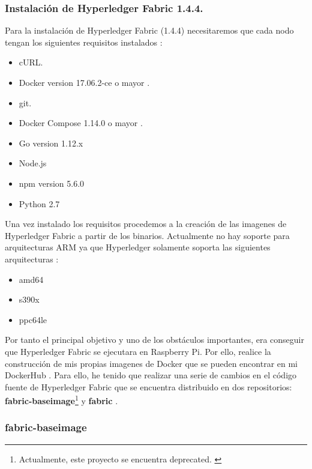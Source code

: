 \newpage

\subsubsection*{Instalación de Hyperledger Fabric 1.4.4.}

Para la instalación de Hyperledger Fabric (1.4.4) necesitaremos que cada nodo tengan los siguientes requisitos instalados 
\cite{hyperledger-fabric-docs}:

\begin{itemize}
  \item cURL.
  \item Docker version 17.06.2-ce o mayor \cite{install-docker-rasp, set-up-docker-rasp}.
  \item git.
  \item Docker Compose 1.14.0 o mayor \cite{install-docker-rasp, set-up-docker-rasp}.
  \item Go version 1.12.x
  \item Node.js
  \item npm version 5.6.0
  \item Python 2.7
\end{itemize}

\noindent Una vez instalado los requisitos procedemos a la creación de las imagenes de Hyperledger Fabric a partir de 
los binarios. Actualmente no hay soporte para arquitecturas ARM ya que Hyperledger solamente soporta las siguientes 
arquitecturas \cite{build-docker-images}:

\begin{itemize}
  \item amd64
  \item s390x
  \item ppc64le
\end{itemize}

\noindent Por tanto el principal objetivo y uno de los obstáculos importantes, era conseguir que Hyperledger Fabric 
se ejecutara en Raspberry Pi. Por ello, realice la construcción de mis propias imagenes de Docker que se pueden 
encontrar en mi DockerHub \cite{dockerhub}. Para ello, he tenido que realizar una serie de cambios en el código fuente
de Hyperledger Fabric que se encuentra distribuido en dos repositorios: \textbf{fabric-baseimage}\footnote{Actualmente, 
este proyecto se encuentra deprecated. \label{fnlabel}} y \textbf{fabric} \cite{fabric-baseimage, fabric}. 

\subsubsection*{fabric-baseimage}

